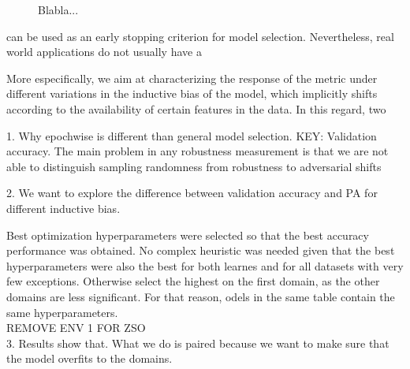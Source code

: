\begin{definition}[SO/GO in DiagVib-6]
\begin{figure}[H]
\begin{subfigure}[b]{0.17\textwidth}
        \end{subfigure}
        
        \caption{Blabla...}
    \end{figure}
\end{definition}




can be used as an early stopping criterion
for model selection. Nevertheless, real world applications do not usually have a 



More especifically,
we aim at characterizing the response of the metric under different variations in the inductive
bias of the model, which implicitly shifts according to the availability of certain features
in the data. In this regard, two 

1. Why epochwise is different than general model selection. KEY: Validation accuracy. The
main problem in any robustness measurement is that we are not able to distinguish sampling
randomness from robustness to adversarial shifts


2. We want to explore the difference between validation accuracy and PA for different inductive
bias.

Best optimization hyperparameters were selected so that the
best accuracy performance was obtained. No complex heuristic was
needed given that the best hyperparameters were also the best
for both learnes and for all datasets with very few exceptions.
Otherwise select the highest on the first domain, as the other
domains are less significant. 
For that reason, odels in the same table contain the same hyperparameters. \\

REMOVE ENV 1 FOR ZSO \\

3. Results show that. What we do is paired because we want to make sure that
the model overfits to the domains. \\

